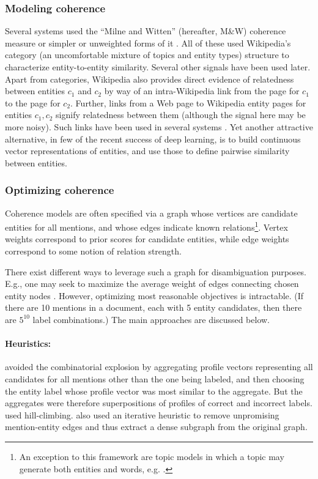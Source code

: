 \subsubsection{Modeling coherence}

Several systems \cite{Milne2008,KulkarniSRC09,Hoffart2011} used the ``Milne and Witten'' (hereafter, M\&W) coherence measure \cite{Milne2008} or simpler or unweighted forms of it \cite{Cucerzan07}.  All of these used Wikipedia's category (an uncomfortable mixture of topics and entity types) structure to characterize entity-to-entity similarity.  Several other signals have been used later.  Apart from categories, Wikipedia also provides direct evidence of relatedness between entities $c_1$ and $c_2$ by way of an intra-Wikipedia link from the page for $c_1$ to the page for $c_2$.  Further, links from a Web page to Wikipedia entity pages for entities $c_1, c_2$ signify relatedness between them (although the signal here may be more noisy).  Such links have been used in several systems \cite{ChengR13,Chisholm2015}.  Yet another attractive alternative, in few of the recent success of deep learning, is to build continuous vector representations of entities, and use those to define pairwise similarity between entities.


\subsubsection{Optimizing coherence}

Coherence models are often specified via a graph whose vertices are candidate entities for all mentions, and whose edges indicate known relations\footnote{An exception to this framework are topic models in which a topic may generate both entities and words, e.g. \cite{kataria2011,HanS12,houlsby2014scalable}.}.  Vertex weights correspond to prior scores for candidate entities, while edge weights correspond to some notion of relation strength. 

There exist different ways to leverage such a graph for disambiguation purposes.  E.g., one may seek to maximize the average weight of edges connecting chosen entity nodes \cite{Milne2008,Ferragina10}.  However, optimizing most reasonable objectives is intractable.  (If there are 10 mentions in a document, each with 5 entity candidates, then there are $5^{10}$ label combinations.)  The main approaches are discussed below.

\paragraph*{Heuristics:}
\cite{Cucerzan07} avoided the combinatorial explosion by aggregating profile vectors representing all candidates for all mentions other than the one being labeled, and then choosing the entity label whose profile vector was most similar to the aggregate.   But the aggregates were therefore superpositions of profiles of correct and incorrect labels.  \cite{KulkarniSRC09} used hill-climbing.  \cite{Hoffart2011} also used an iterative heuristic to remove unpromising mention-entity edges and thus extract a dense subgraph from the original graph.

